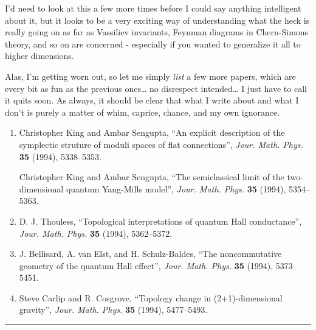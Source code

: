 \documentclass{article}
\begin{document}
I'd need to look at this a few more times before I could say anything
intelligent about it, but it looks to be a very exciting way of
understanding what the heck is really going on as far as Vassiliev
invariants, Feynman diagrams in Chern-Simons theory, and so on are
concerned - especially if you wanted to generalize it all to higher
dimensions.

Alas, I'm getting worn out, so let me simply \emph{list} a few more
papers, which are every bit as fun as the previous ones\ldots{} no
disrespect intended\ldots{} I just have to call it quits soon. As
always, it should be clear that what I write about and what I don't is
purely a matter of whim, caprice, chance, and my own ignorance.

\begin{enumerate}
\def\labelenumi{\arabic{enumi})}
\setcounter{enumi}{3}
\item
  Christopher King and Ambar Sengupta, ``An explicit description of the
  symplectic struture of moduli spaces of flat connections'',
  \emph{Jour. Math. Phys.} \textbf{35} (1994), 5338--5353.

  Christopher King and Ambar Sengupta, ``The semiclassical limit of the
  two-dimensional quantum Yang-Mills model'', \emph{Jour. Math. Phys.}
  \textbf{35} (1994), 5354--5363.
\item
  D. J. Thouless, ``Topological interpretations of quantum Hall
  conductance'', \emph{Jour. Math. Phys.} \textbf{35} (1994),
  5362--5372.
\item
  J. Bellisard, A. van Elst, and H. Schulz-Baldes, ``The noncommutative
  geometry of the quantum Hall effect'', \emph{Jour. Math. Phys.}
  \textbf{35} (1994), 5373--5451.
\item
  Steve Carlip and R. Cosgrove, ``Topology change in (2+1)-dimensional
  gravity'', \emph{Jour. Math. Phys.} \textbf{35} (1994), 5477--5493.
\end{enumerate}

\begin{center}\rule{0.5\linewidth}{0.5pt}\end{center}
\end{document}

